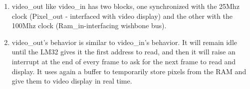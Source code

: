 \begin{enumerate}
\item video\_out like video\_in has two blocks, one synchronized with the 25Mhz clock (Pixel\_out - interfaced with video display) and the other with the 100Mhz clock (Ram\_in-interfacing wishbone bus).

\item video\_out's behavior is similar to video\_in's behavior. It will remain idle until the LM32 gives it the first address to read, and then it will raise an interrupt at the end of every frame to ask for the next frame to read and display. It uses again a buffer to temporarily store pixels from the RAM and give them to video display in real time. 

\end{enumerate}
